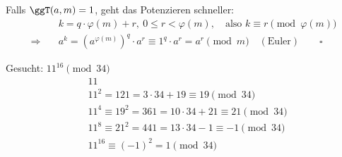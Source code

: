 \begin{bemerkung}
Falls $\ggT(a, m) = 1$, geht das Potenzieren schneller:
\begin{align*}
  & k = q \cdot \varphi(m) + r,\ 0 \leq r < \varphi(m), \quad \text{also } k \equiv r \pmod{\varphi(m)} \\
  \Rightarrow\quad & a^k = (a^{\varphi(m)})^q \cdot a^r \equiv 1^q \cdot a^r = a^r \pmod{m} \quad (\text{Euler}) \qquad \square
\end{align*}
\end{bemerkung}

\begin{beispiel}
Gesucht: $11^{16} \pmod{34}$
\begin{align*}
  & 11 \\
  & 11^2 = 121 = 3 \cdot 34 + 19 \equiv 19 \pmod{34} \\
  & 11^4 \equiv 19^2 = 361 = 10 \cdot 34 + 21 \equiv 21 \pmod{34} \\
  & 11^8 \equiv 21^2 = 441 = 13 \cdot 34 - 1 \equiv -1 \pmod{34} \\
  & 11^{16} \equiv (-1)^2 = 1 \pmod{34}
\end{align*}
\end{beispiel}

